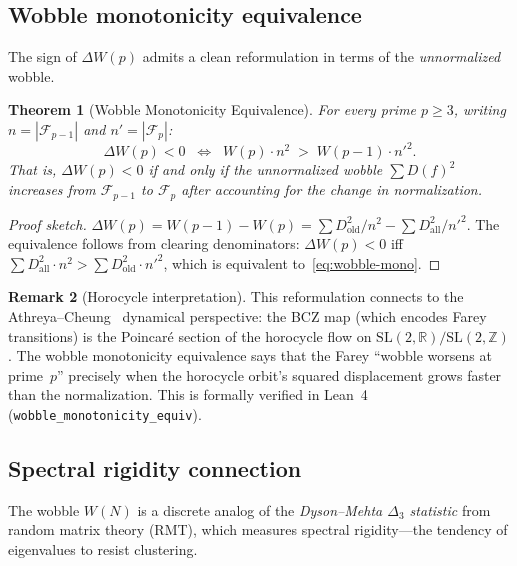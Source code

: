 \documentclass[11pt]{article}
\newtheorem{theorem}{Theorem}[section]
\theoremstyle{definition}
\newtheorem{remark}[theorem]{Remark}
\newcommand{\Z}{\mathbb{Z}}
\newcommand{\R}{\mathbb{R}}
\newcommand{\F}{\mathcal{F}}
\begin{document}
\subsection{Wobble monotonicity equivalence}

The sign of $\Delta W(p)$ admits a clean reformulation in terms
of the \emph{unnormalized} wobble.

\begin{theorem}[Wobble Monotonicity Equivalence]\label{thm:wobble-mono}
For every prime $p \ge 3$, writing $n = |\F_{p-1}|$ and $n' = |\F_p|$:
\begin{equation}\label{eq:wobble-mono}
  \Delta W(p) < 0
  \;\;\Longleftrightarrow\;\;
  W(p) \cdot n^2 \;>\; W(p-1) \cdot {n'}^2.
\end{equation}
That is, $\Delta W(p) < 0$ if and only if the \emph{unnormalized}
wobble $\sum D(f)^2$ increases from $\F_{p-1}$ to $\F_p$
after accounting for the change in normalization.
\end{theorem}

\begin{proof}[Proof sketch]
$\Delta W(p) = W(p-1) - W(p) = \sum D^2_{\text{old}}/n^2 -
\sum D^2_{\text{all}}/{n'}^2$.  The equivalence follows from
clearing denominators: $\Delta W(p) < 0$ iff
$\sum D^2_{\text{all}} \cdot n^2 > \sum D^2_{\text{old}} \cdot {n'}^2$,
which is equivalent to~\eqref{eq:wobble-mono}.
\end{proof}

\begin{remark}[Horocycle interpretation]
This reformulation connects to the Athreya--Cheung~\cite{AthreyaCheung2014}
dynamical perspective: the BCZ map (which encodes Farey transitions)
is the Poincar\'e section of the horocycle flow on $\mathrm{SL}(2,\R)/\mathrm{SL}(2,\Z)$.
The wobble monotonicity equivalence says that the Farey
``wobble worsens at prime~$p$'' precisely when the horocycle
orbit's squared displacement grows faster than the normalization.
This is formally verified in Lean~4
(\texttt{wobble\_monotonicity\_equiv}).
\end{remark}

\subsection{Spectral rigidity connection}

The wobble $W(N)$ is a discrete analog of the \emph{Dyson--Mehta
$\Delta_3$ statistic} from random matrix theory (RMT), which measures
spectral rigidity---the tendency of eigenvalues to resist clustering.
\end{document}
